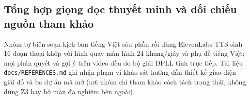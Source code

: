 \subsection{Tổng hợp giọng đọc thuyết minh và đối chiếu nguồn tham khảo}

Nhóm tự biên soạn kịch bản tiếng Việt sáu phần rồi dùng ElevenLabs TTS sinh 16 đoạn thoại khớp với hình quay màn hình 24 khung/giây và phụ đề tiếng Việt; mọi phán quyết và gợi ý trên video đều do bộ giải DPLL tính trực tiếp. Tài liệu \texttt{docs/REFERENCES.md} ghi nhận phạm vi khảo sát hướng dẫn thiết kế giao diện giải đố \cite{gamedev} và ba dự án mã mở \cite{safina,trantai,wadew} (nơi nhóm chỉ tham khảo cách tách trạng thái, không dùng Z3 hay bộ màn đa nghiệm bên ngoài).

\par\endgroup
